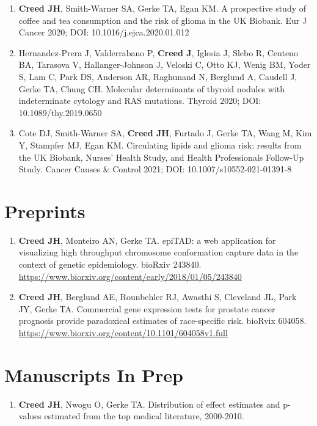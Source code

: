 \documentclass[11pt, a4paper]{article} %
\begin{document}
\begin{enumerate}[leftmargin=*]
\item{} {\bf Creed JH}, Smith-Warner SA, Gerke TA, Egan KM. A prospective study of coffee and tea consumption and the risk of glioma in the UK Biobank. Eur J Cancer 2020; DOI: 10.1016/j.ejca.2020.01.012

\item{} Hernandez-Prera J, Valderrabano P, {\bf Creed J}, Iglesia J, Slebo R, Centeno BA, Tarasova V, Hallanger-Johnson J, Veloski C, Otto KJ, Wenig BM, Yoder S, Lam C, Park DS, Anderson AR, Raghunand N, Berglund A, Caudell J, Gerke TA, Chung CH.  Molecular determinants of thyroid nodules with indeterminate cytology and RAS mutations. Thyroid 2020; DOI: 10.1089/thy.2019.0650

\item{} Cote DJ, Smith-Warner SA, {\bf Creed JH}, Furtado J, Gerke TA, Wang M, Kim Y, Stampfer MJ, Egan KM. Circulating lipids and glioma risk: results from the UK Biobank, Nurses’ Health Study, and Health Professionals Follow-Up Study. Cancer Causes \& Control 2021; DOI: 10.1007/s10552-021-01391-8

\end{enumerate}

\section*{Preprints}
\begin{enumerate}[leftmargin=*]

\item{} {\bf Creed JH}, Monteiro AN, Gerke TA. epiTAD: a web application for visualizing high throughput chromosome conformation capture data in the context of genetic epidemiology. bioRxiv 243840. \href{https://www.biorxiv.org/content/early/2018/01/05/243840}{https://www.biorxiv.org/content/early/2018/01/05/243840}

\item{} {\bf Creed JH}, Berglund AE, Rounbehler RJ, Awasthi S, Cleveland JL, Park JY, Gerke TA. Commercial gene expression tests for prostate cancer prognosis provide  paradoxical estimates of race-specific risk. bioRvix 604058. \\\href{https://www.biorxiv.org/content/10.1101/604058v1.full}{https://www.biorxiv.org/content/10.1101/604058v1.full}
\end{enumerate}

\section*{Manuscripts In Prep}
\begin{enumerate}[leftmargin=*]

\item{} {\bf Creed JH}, Nwogu O, Gerke TA. Distribution of effect estimates and p-values estimated from the top medical literature, 2000-2010. 

\end{enumerate}
\end{document}
